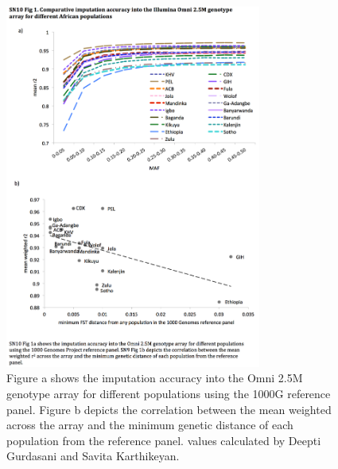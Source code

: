 \begin{figure}

\centering

\includegraphics[trim={0 3cm 0 1.5cm},clip,width=0.75\textwidth]{fig/SN10f1}

\caption[Imputation accuracy for different populations as a function of \gls{MAF} and .]{Figure a shows the imputation accuracy into the Omni 2.5M genotype array for different populations using the \gls{1000G} reference panel. Figure b depicts the correlation between the mean weighted  across the array and the minimum genetic distance of each population from the reference panel.  values calculated by Deepti Gurdasani and Savita Karthikeyan.}

\label{fig:SN10f1}

\end{figure}